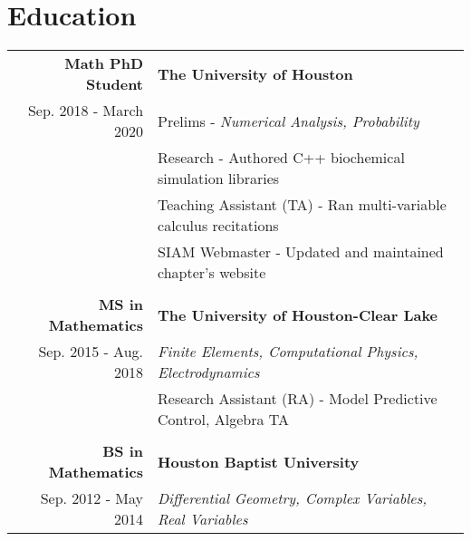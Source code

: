 \section*{\color{Blue}Education\vspace{0.5mm}{\color{Orange}\hrule}}

\begin{tabular}{ r | l }
\bf Math PhD Student            &\bf The University of Houston\\
Sep. 2018 - March 2020          &Prelims - \textit{Numerical Analysis, Probability}\\
                                &Research - Authored C++ biochemical simulation libraries\\
                                &Teaching Assistant (TA) - Ran multi-variable calculus recitations\\
                                &SIAM Webmaster - Updated and maintained chapter's website\\
\\
\bf MS in Mathematics           &\bf The University of Houston-Clear Lake\\
Sep. 2015 - Aug. 2018           &\textit{Finite Elements, Computational Physics, Electrodynamics}\\
                                &Research Assistant (RA) - Model Predictive Control, Algebra TA\\
\\
\bf BS in Mathematics           &\bf Houston Baptist University\\
Sep. 2012 - May 2014            &\textit{Differential Geometry, Complex Variables, Real Variables}
\end{tabular}